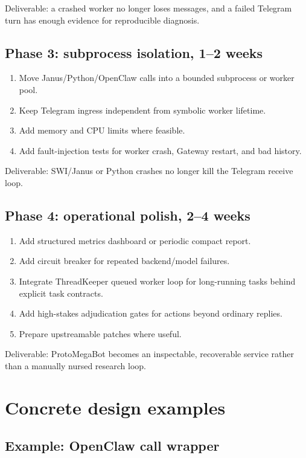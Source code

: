 \documentclass[11pt]{article}
\begin{document}
Deliverable: a crashed worker no longer loses messages, and a failed Telegram turn has enough evidence for reproducible diagnosis.

\subsection{Phase 3: subprocess isolation, 1--2 weeks}

\begin{enumerate}
  \item Move Janus/Python/OpenClaw calls into a bounded subprocess or worker pool.
  \item Keep Telegram ingress independent from symbolic worker lifetime.
  \item Add memory and CPU limits where feasible.
  \item Add fault-injection tests for worker crash, Gateway restart, and bad history.
\end{enumerate}

Deliverable: SWI/Janus or Python crashes no longer kill the Telegram receive loop.

\subsection{Phase 4: operational polish, 2--4 weeks}

\begin{enumerate}
  \item Add structured metrics dashboard or periodic compact report.
  \item Add circuit breaker for repeated backend/model failures.
  \item Integrate ThreadKeeper queued worker loop for long-running tasks behind explicit task contracts.
  \item Add high-stakes adjudication gates for actions beyond ordinary replies.
  \item Prepare upstreamable patches where useful.
\end{enumerate}

Deliverable: ProtoMegaBot becomes an inspectable, recoverable service rather than a manually nursed research loop.

\section{Concrete design examples}

\subsection{Example: OpenClaw call wrapper}
\end{document}
